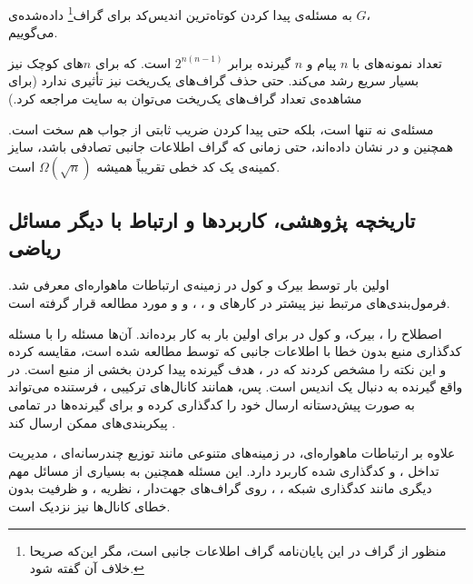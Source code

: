 \begin{notation}
	به مسئله‌ی پیدا کردن کوتاه‌ترین اندیس‌کد برای 
 گراف\footnote{منظور از گراف در این پایان‌نامه گراف اطلاعات جانبی است، مگر این‌که صریحا خلاف آن گفته شود.}
	داده‌شده‌ی 
	$G$،
\\ \icodg 
	می‌گوییم.
\end{notation}
		\begin{remark}
		تعداد نمونه‌های \icod با
		$n$
		پیام و 
		$n$
		گیرنده برابر
		$2^{n(n - 1)}$
		است. که برای
		$n$های
		کوچک نیز بسیار سریع رشد می‌کند. حتی حذف گراف‌های یک‌ریخت نیز تأثیری ندارد (برای مشاهده‌ی تعداد گراف‌های یک‌ریخت می‌توان به سایت \cite{web:unlabeled} مراجعه کرد.)
	
     مسئله‌ی
	\icod
نه تنها	
 \nphard  
 است،
 بلکه حتی پیدا کردن ضریب ثابتی از جواب هم سخت است. همچنین
	و
	در
	\cite{6283850}
	نشان داده‌اند، حتی زمانی که گراف اطلاعات جانبی تصادفی باشد، سایز کمینه‌ی یک کد خطی تقریباً همیشه
	$\Omega(\sqrt{n})$
	است.
		\end{remark}


\subsection{تاریخچه پژوهشی، کاربردها و ارتباط با دیگر مسائل ریاضی}
اولین بار
\icod توسط بیرک و کول 
\cite{25, 26}
 در زمینه‌ی ارتباطات ماهواره‌ای معرفی شد. فرمول‌بندی‌های مرتبط نیز پیشتر در کارهای 
 	و 
  \cite{paper:1455117:Celebiler}،
  ،
  و
\cite{152}
و
\cite{158}
 مورد مطالعه قرار گرفته است.
 
 \noindent
  اصطلاح 
   را 
  ، بیرک،
  و کول در
\cite{4031356}
 برای اولین بار به کار برده‌اند. آن‌ها مسئله \icod را با مسئله کدگذاری منبع بدون خطا با اطلاعات جانبی که توسط
\cite{1055607}
 مطالعه شده است، مقایسه کرده و این نکته را مشخص کردند که در \icod، هدف گیرنده پیدا کردن بخشی از منبع است. در واقع گیرنده به دنبال یک اندیس است. پس، همانند کانال‌های ترکیبی
 \cite{27, 53, 154}،
 فرستنده می‌تواند به صورت پیش‌دستانه ارسال خود را کدگذاری کرده و برای گیرنده‌ها در تمامی پیکربندی‌های ممکن ارسال کند
\cite{48}.

 علاوه بر ارتباطات ماهواره‌ای، \icod در زمینه‌های متنوعی مانند توزیع چندرسانه‌ای 
\cite{114}،
مدیریت تداخل 
\cite{81}،
و 
 کدگذاری شده 
\cite{103, 82}
 کاربرد دارد. این مسئله همچنین به بسیاری از مسائل مهم دیگری مانند کدگذاری شبکه 
\cite{122, 61, 59}،
\cite{108, 128, 13}،
 روی گراف‌های جهت‌دار 
\cite{122, 162, 13}،
نظریه
\cite{61}،
و ظرفیت بدون خطای کانال‌ها 
\cite{131}
 نیز نزدیک است.
 
